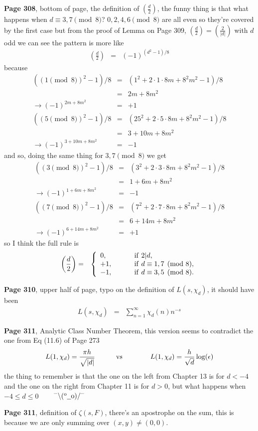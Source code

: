 \documentclass[aps,preprint,preprintnumbers,nofootinbib,showpacs,prd]{revtex4-1}
\newcommand{\nbea}{\begin{eqnarray*}}
\newcommand{\neea}{\end{eqnarray*}}
\newcommand{\dunno}{$ {}^{\mbox {--}}\backslash(^{\rm o}{}\underline{\hspace{0.2cm}}{\rm o})/^{\mbox {--}}$}
\begin{document}
{\bf Page 308}, bottom of page, the definition of $\left(\frac{d}{2}\right)$, the funny thing is that what happens when $d \equiv 3,7 \pmod{8}$? $0,2,4,6 \pmod{8}$ are all even so they're covered by the first case but from the proof of Lemma on Page 309, $\left(\frac{d}{2}\right) = \left(\frac{2}{|d|}\right)$ with $d$ odd we can see the pattern is more like
%
\nbea
\left(\frac{d}{2}\right) & = & (-1)^{(d^2-1)/8}
\neea
%
because
%
\nbea
((1 \pmod{8})^2 - 1)/8 & = & (1^2 + 2\cdot1\cdot8m + 8^2m^2 - 1)/8 \\
& = & 2m + 8m^2 \\
\to (-1)^{2m + 8m^2} & = & +1 \\
((5 \pmod{8})^2 - 1)/8 & = & (25^2 + 2\cdot5\cdot8m + 8^2m^2 - 1)/8 \\
& = & 3 + 10m + 8m^2 \\
\to (-1)^{3 + 10m + 8m^2} & = & -1
\neea
%
and so, doing the same thing for $3,7 \pmod{8}$ we get
%
\nbea
((3 \pmod{8})^2 - 1)/8 & = & (3^2 + 2\cdot3\cdot8m + 8^2m^2 - 1)/8 \\
& = & 1 + 6m + 8m^2 \\
\to (-1)^{1 + 6m + 8m^2} & = & -1 \\
((7\pmod{8})^2 - 1)/8 & = & (7^2 + 2\cdot7\cdot8m + 8^2m^2 - 1)/8 \\
& = & 6 + 14m + 8m^2 \\
\to (-1)^{6 + 14m + 8m^2} & = & +1
\neea
%
so I think the full rule is
%
\nbea
\left(\frac{d}{2}\right) & = &
\left \{
\begin{array}{l c l}
0, & ~~~ & {\rm~if~} 2|d,\\
+1, & ~~~ & {\rm~if~} d \equiv 1,7 \pmod{8},\\
-1, & ~~~ & {\rm~if~} d \equiv 3,5 \pmod{8}.
\end{array}
\right.
\neea
%

{\bf Page 310}, upper half of page, typo on the definition of $L(s,\chi_d)$, it should have been
%
\nbea
L(s,\chi_d) & = & \sum_{n=1}^\infty \chi_d(n) n^{-s}
\neea
%

{\bf Page 311}, Analytic Class Number Theorem, this version seems to contradict the one from Eq (11.6) of Page 273
%
\nbea
L(1,\chi_d) = \frac{\pi h}{\sqrt{|d|}} &{\rm~~~~~~~~~vs~~~~~~~~~}& L(1,\chi_d) = \frac{h}{\sqrt{d}}\log(\epsilon)
\neea
%
the thing to remember is that the one on the left from Chapter 13 is for $d < -4$ and the one on the right from Chapter 11 is for $d > 0$, but what happens when $-4 \le d \le 0$ ~~~ \dunno

{\bf Page 311}, definition of $\zeta(s,F)$, there's an apostrophe on the sum, this is because we are only summing over $(x,y) \neq (0,0)$.
\end{document}
